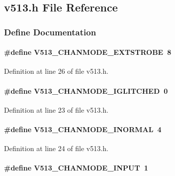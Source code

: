 \subsection{v513.h File Reference}
\label{v513_8h}


\subsubsection{Define Documentation}
\paragraph[{V513\_\-CHANMODE\_\-EXTSTROBE}]{\setlength{\rightskip}{0pt plus 5cm}\#define V513\_\-CHANMODE\_\-EXTSTROBE~8}\hfill\label{v513_8h_a9d4069634a29a77ebaecedac0cbb87da}


Definition at line 26 of file v513.h.
\paragraph[{V513\_\-CHANMODE\_\-IGLITCHED}]{\setlength{\rightskip}{0pt plus 5cm}\#define V513\_\-CHANMODE\_\-IGLITCHED~0}\hfill\label{v513_8h_a4a0c34aeaa88b935599ba8f4f4afa50c}


Definition at line 23 of file v513.h.
\paragraph[{V513\_\-CHANMODE\_\-INORMAL}]{\setlength{\rightskip}{0pt plus 5cm}\#define V513\_\-CHANMODE\_\-INORMAL~4}\hfill\label{v513_8h_a8b8326293061afe62eb9394bb0d49cc2}


Definition at line 24 of file v513.h.
\paragraph[{V513\_\-CHANMODE\_\-INPUT}]{\setlength{\rightskip}{0pt plus 5cm}\#define V513\_\-CHANMODE\_\-INPUT~1}\hfill\label{v513_8h_af17e1ee895c85c64b6cc62d742cb4161}


